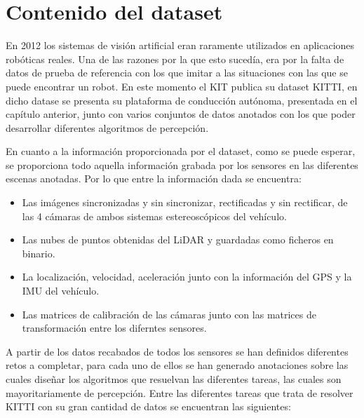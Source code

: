 \section{Contenido del dataset}
\label{sec:Contenido del dataset}

En 2012 los sistemas de visión artificial eran raramente utilizados en aplicaciones robóticas reales. Una de las razones por la que esto sucedía, era por la falta de datos de prueba de referencia con los que imitar a las situaciones con las que se puede encontrar un robot. En este momento el \ac{KIT} publica su dataset KITTI, en dicho datase se presenta su plataforma de conducción autónoma, presentada en el capítulo anterior, junto con varios conjuntos de datos anotados con los que poder desarrollar diferentes algoritmos de percepción.

En cuanto a la información proporcionada por el dataset, como se puede esperar, se proporciona todo aquella información grabada por los sensores en las diferentes escenas anotadas. Por lo que entre la información dada se encuentra:

\begin{itemize}
    \item Las imágenes sincronizadas y sin sincronizar, rectificadas y sin rectificar, de las 4 cámaras de ambos sistemas estereoscópicos del vehículo.
    \item Las nubes de puntos obtenidas del \ac{LiDAR} y guardadas como ficheros en binario.
    \item La localización, velocidad, aceleración junto con la información del \ac{GPS} y la \ac{IMU} del vehículo.
    \item Las matrices de calibración de las cámaras junto con las matrices de transformación entre los diferntes sensores.
\end{itemize}

A partir de los datos recabados de todos los sensores se han definidos diferentes retos a completar, para cada uno de ellos se han generado anotaciones sobre las cuales diseñar los algoritmos que resuelvan las diferentes tareas, las cuales son mayoritariamente de percepción. Entre las diferentes tareas que trata de resolver KITTI con su gran cantidad de datos se encuentran las siguientes:

